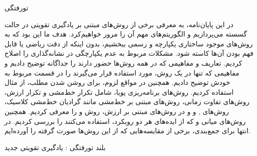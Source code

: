 


\pagestyle{empty}

‌تورفتگی

 در این پایان‌نامه، به معرفی برخی از روش‌های مبتنی بر یادگیری تقویتی در حالت گسسته می‌پردازیم و الگوریتم‌های مهم آن را مرور خواهیم‌کرد. 
هدف ما این بود که به روش‌های موجود ساختاری یکپارچه و رسمی ببخشیم،
 بدون اینکه از دقت ریاضی یا قابل فهم بودن آن‌ها کاسته شود.
 مشکلات مربوط به عدم یکپارچگی در نشانه‌گذاری را اصلاح کردیم.
 تعاریف و مفاهیمی که در همه روش‌ها حضور دارند را جداگانه توضیح دادیم و مفاهیمی که تنها در یک روش، مورد استفاده قرار می‌گیرند را در قسمت مربوط به خودش توضیح دادیم.
همچنین در مواقع لزوم، برای روشن شدن مطلب، از مثال استفاده کردیم.
روش‌های برنامه‌ریزی پویا، شامل تکرار خط‌مشی و تکرار ارزش، روش‌های تفاوت زمانی، روش‌های مبتنی بر خط‌مشی مانند گرادیان خط‌مشی کلاسیک، روش‌های 
,
و
و در روش‌های مبتنی بر ارزش، روش
و
را معرفی کردیم. همچنین روش‌های میانی 
و
که از ایده‌های هر دو رویکرد، استفاده می‌کنند را بررسی کردیم.
در انتها برای جمع‌بندی، برخی از مقایسه‌هایی که از این روش‌ها صورت گرفته را آورده‌ایم.


‌بلند
‌تورفتگی : 
یادگیری تقویتی
‌جدید
